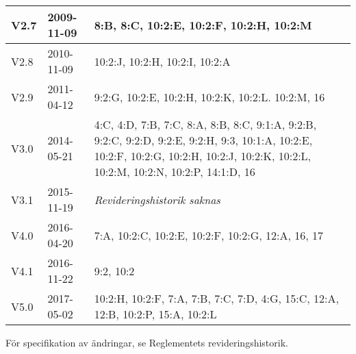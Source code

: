 \documentclass[10pt]{article}
\begin{document}
\begin{center}
\begin{tabular}{| l | l | p{10cm} |}
    \hline
    V2.7 & 2009-11-09 &  8:B, 8:C, 10:2:E, 10:2:F, 10:2:H, 10:2:M\\
    \hline
    V2.8 & 2010-11-09 & 10:2:J, 10:2:H, 10:2:I, 10:2:A\\
    \hline
    V2.9 & 2011-04-12 & 9:2:G, 10:2:E, 10:2:H, 10:2:K, 10:2:L. 10:2:M, 16 \\
    \hline
    V3.0 & 2014-05-21 &  4:C, 4:D, 7:B, 7:C, 8:A, 8:B, 8:C, 9:1:A, 9:2:B, 9:2:C, 9:2:D, 9:2:E, 9:2:H, 9:3, 10:1:A, 10:2:E, 10:2:F, 10:2:G, 10:2:H, 10:2:J, 10:2:K, 10:2:L, 10:2:M, 10:2:N, 10:2:P, 14:1:D, 16\\
    \hline
    V3.1 & 2015-11-19 & \emph{Revideringshistorik saknas} \\
    \hline
    V4.0 & 2016-04-20 & 7:A, 10:2:C, 10:2:E, 10:2:F, 10:2:G, 12:A, 16, 17 \\
    \hline
    V4.1 & 2016-11-22 & 9:2, 10:2 \\
    \hline
    V5.0 & 2017-05-02 & 10:2:H, 10:2:F, 7:A, 7:B, 7:C, 7:D, 4:G, 15:C, 12:A, 12:B, 10:2:P, 15:A, 10:2:L \\
\end{tabular}
\end{center}
För specifikation av ändringar, se Reglementets revideringshistorik.
\end{document}
